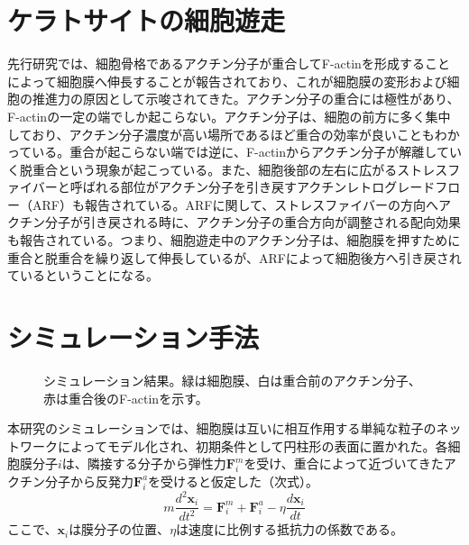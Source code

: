 \documentclass[10pt,twocolumn,a4j]{jarticle}
\begin{document}
\section{ケラトサイトの細胞遊走}
先行研究では、細胞骨格であるアクチン分子が重合してF-actinを形成することによって細胞膜へ伸長することが報告されており、これが細胞膜の変形および細胞の推進力の原因として示唆されてきた\cite{svitkina1997analysis}。アクチン分子の重合には極性があり、F-actinの一定の端でしか起こらない。アクチン分子は、細胞の前方に多く集中しており、アクチン分子濃度が高い場所であるほど重合の効率が良いこともわかっている。重合が起こらない端では逆に、F-actinからアクチン分子が解離していく脱重合という現象が起こっている。また、細胞後部の左右に広がるストレスファイバーと呼ばれる部位がアクチン分子を引き戻すアクチンレトログレードフロー（ARF）も報告されている\cite{swaminathan2017actin}。ARFに関して、ストレスファイバーの方向へアクチン分子が引き戻される時に、アクチン分子の重合方向が調整される配向効果も報告されている。つまり、細胞遊走中のアクチン分子は、細胞膜を押すために重合と脱重合を繰り返して伸長しているが、ARFによって細胞後方へ引き戻されているということになる。
\section{シミュレーション手法}
\begin{figure}[tbp]
\centering
 \caption{シミュレーション結果。緑は細胞膜、白は重合前のアクチン分子、赤は重合後のF-actinを示す。}
 \label{fig:res0}
\end{figure}
本研究のシミュレーションでは、細胞膜は互いに相互作用する単純な粒子のネットワークによってモデル化され、初期条件として円柱形の表面に置かれた。各細胞膜分子$i$は、隣接する分子から弾性力$\bm{F}_i^m$を受け、重合によって近づいてきたアクチン分子から反発力$\bm{F}_i^a$を受けると仮定した（次式）。
\begin{equation}
m\frac{d^2\bm{x}_i}{dt^2} = \bm{F}^m_i +  \bm{F}^a_i - \eta \frac{d\bm{x}_i}{dt}
\end{equation}
ここで、$\bm{x}_i$は膜分子の位置、$\eta$は速度に比例する抵抗力の係数である。
\end{document}
